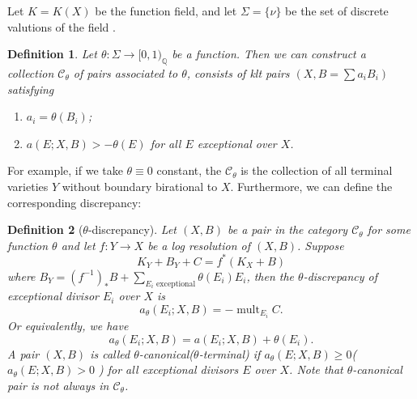 \documentclass[11pt]{amsart}
\numberwithin{equation}{section}
\newtheorem{defn}{Definition}[subsection]
\begin{document}
Let $ K=K(X) $ be the function field, and let $ \Sigma=\{\nu\} $ be the set of discrete valutions of the field . 
\begin{defn}\label{thetacategory}
  \cite[Definition 3.5]{brunoLogSarkisovProgram1995}
  Let  $\theta:\Sigma\to [0,1)_\mathbb{Q}$ be a function. Then we can construct a collection $ \mathcal{C}_\theta $ of pairs  associated to $ \theta $, consists of klt pairs $ (X,B=\sum a_iB_i) $ satisfying
  \begin{enumerate}
    \item $ a_i=\theta(B_i) $;
    \item $ a(E;X,B)>-\theta(E) $ for all $ E $ exceptional over $ X $.
  \end{enumerate} 
\end{defn}
For example, if we take $\theta \equiv 0$ constant, the $\mathcal{C}_{\theta}$ is the collection of all terminal varieties $Y$ without boundary birational to $X$. Furthermore, we can define the corresponding discrepancy:
\begin{defn}[$\theta$-discrepancy]
  Let $(X,B)$ be a pair in the category $\mathcal{C}_{\theta}$ for some function $\theta$ and let  $f:Y\to X$ be a log resolution of $(X,B)$. Suppose
  \[
  K_{Y}+B_{Y}+C=f^*(K_{X}+B)
  \]
  where $B_{Y}=(f^{-1})_*B+ \sum_{E_{i}\text{ exceptional}} \theta(E_{i})E_{i}$, then the $\theta$-discrepancy  of exceptional divisor $E_{i}$ over $X$ is 
  \[
    a_{\theta}(E_{i};X,B)=-\operatorname{mult}_{E_{i}}C.
  \]
 Or equivalently, we have 
 \[
    a_{\theta}(E_{i};X,B)=a(E_{i};X,B)+\theta(E_{i}).
 \]
A pair $(X,B)$ is called $\theta$-canonical($\theta$-terminal) if $a_{\theta}(E;X,B)\geqslant 0$($a_{\theta}(E;X,B)> 0$ ) for all exceptional  divisors $E$ over $X$.  Note that $\theta$-canonical pair is not always in $\mathcal{C}_{\theta}$.
\end{defn}


\end{document}
